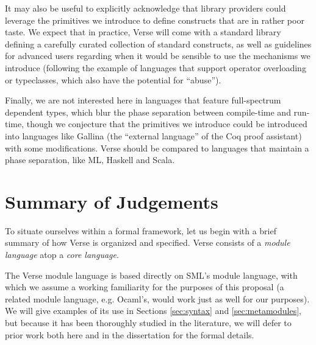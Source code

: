 It may also be useful to explicitly acknowledge that library providers could leverage the primitives we introduce   to define constructs that are in rather poor taste. We  expect that in practice, Verse will come with a standard library defining a carefully curated collection of standard constructs, as well as guidelines for advanced users regarding when it would be sensible to use the mechanisms we introduce (following the example of languages that support operator overloading or typeclasses, which also have the potential for ``abuse''). %

Finally, we are not interested here in languages that feature full-spectrum dependent types, which blur the phase separation between compile-time and run-time, though we conjecture that the primitives we introduce could be introduced into languages like Gallina (the ``external language'' of the Coq proof assistant) with some modifications. Verse should be compared to languages that maintain a phase separation, like ML, Haskell and Scala. %



\section{Summary of Judgements}\label{sec:verse}
To situate ourselves within a formal framework, let us begin with a brief summary of how Verse is organized and specified. Verse consists of a \emph{module language} atop a \emph{core language}. 

The Verse module language is based directly on SML's module language, with which we assume a working familiarity for the purposes of this proposal \cite{harper1997programming,MacQueen:1984:MSM:800055.802036} (a related module language, e.g. Ocaml's, would work just as well for our purposes). We will give examples of its use in Sections \ref{sec:syntax} and \ref{sec:metamodules}, but because it has been thoroughly studied in the literature, we will defer to prior work both here and in the dissertation for the formal details.%

